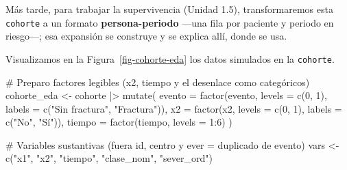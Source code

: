 \documentclass[
  letterpaper,
  DIV=11,
  numbers=noendperiod]{scrartcl}
\newenvironment{Shaded}{\begin{snugshade}}{\end{snugshade}}
\newcommand{\AttributeTok}[1]{\textcolor[rgb]{0.40,0.45,0.13}{#1}}
\newcommand{\CommentTok}[1]{\textcolor[rgb]{0.37,0.37,0.37}{#1}}
\newcommand{\DecValTok}[1]{\textcolor[rgb]{0.68,0.00,0.00}{#1}}
\newcommand{\FunctionTok}[1]{\textcolor[rgb]{0.28,0.35,0.67}{#1}}
\newcommand{\NormalTok}[1]{\textcolor[rgb]{0.00,0.23,0.31}{#1}}
\newcommand{\OtherTok}[1]{\textcolor[rgb]{0.00,0.23,0.31}{#1}}
\newcommand{\SpecialCharTok}[1]{\textcolor[rgb]{0.37,0.37,0.37}{#1}}
\newcommand{\StringTok}[1]{\textcolor[rgb]{0.13,0.47,0.30}{#1}}
\begin{document}
Más tarde, para trabajar la supervivencia (Unidad 1.5), transformaremos
esta \texttt{cohorte} a un formato \textbf{persona-periodo} ---una fila
por paciente y periodo en riesgo---; esa expansión se construye y se
explica allí, donde se usa.

Visualizamos en la Figura~\ref{fig-cohorte-eda} los datos simulados en
la \texttt{cohorte}.

\begin{Shaded}
\begin{Highlighting}[]
\CommentTok{\# Preparo factores legibles (x2, tiempo y el desenlace como categóricos)}
\NormalTok{cohorte\_eda }\OtherTok{\textless{}{-}}\NormalTok{ cohorte }\SpecialCharTok{|\textgreater{}}
  \FunctionTok{mutate}\NormalTok{(}
    \AttributeTok{evento =} \FunctionTok{factor}\NormalTok{(evento, }\AttributeTok{levels =} \FunctionTok{c}\NormalTok{(}\DecValTok{0}\NormalTok{, }\DecValTok{1}\NormalTok{), }\AttributeTok{labels =} \FunctionTok{c}\NormalTok{(}\StringTok{"Sin fractura"}\NormalTok{, }\StringTok{"Fractura"}\NormalTok{)),}
    \AttributeTok{x2     =} \FunctionTok{factor}\NormalTok{(x2,     }\AttributeTok{levels =} \FunctionTok{c}\NormalTok{(}\DecValTok{0}\NormalTok{, }\DecValTok{1}\NormalTok{), }\AttributeTok{labels =} \FunctionTok{c}\NormalTok{(}\StringTok{"No"}\NormalTok{, }\StringTok{"Sí"}\NormalTok{)),}
    \AttributeTok{tiempo =} \FunctionTok{factor}\NormalTok{(tiempo, }\AttributeTok{levels =} \DecValTok{1}\SpecialCharTok{:}\DecValTok{6}\NormalTok{)}
\NormalTok{  )}

\CommentTok{\# Variables sustantivas (fuera \textquotesingle{}id\textquotesingle{}, \textquotesingle{}centro\textquotesingle{} y \textquotesingle{}ever\textquotesingle{} = duplicado de \textquotesingle{}evento\textquotesingle{})}
\NormalTok{vars }\OtherTok{\textless{}{-}} \FunctionTok{c}\NormalTok{(}\StringTok{"x1"}\NormalTok{, }\StringTok{"x2"}\NormalTok{, }\StringTok{"tiempo"}\NormalTok{, }\StringTok{"clase\_nom"}\NormalTok{, }\StringTok{"sever\_ord"}\NormalTok{)}


\end{Highlighting}
\end{Shaded}
\end{document}
